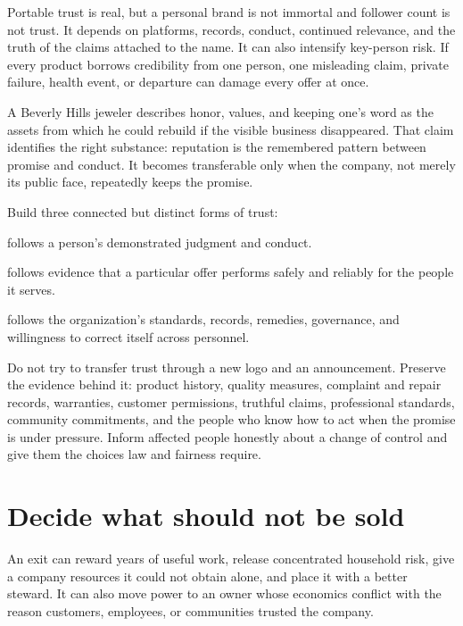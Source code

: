 Portable trust is real, but a personal brand is not immortal and follower count
is not trust. It depends on platforms, records, conduct, continued relevance,
and the truth of the claims attached to the name. It can also intensify
key-person risk. If every product borrows credibility from one person, one
misleading claim, private failure, health event, or departure can damage every
offer at once.

A Beverly Hills jeweler describes honor, values, and keeping one's word as the
assets from which he could rebuild if the visible business disappeared. That
claim identifies the right substance: reputation is the remembered pattern
between promise and conduct. It becomes transferable only when the company,
not merely its public face, repeatedly keeps the promise.

Build three connected but distinct forms of trust:

\begin{description}[leftmargin=2.8em,style=nextline]
\item[Personal trust] follows a person's demonstrated judgment and conduct.
\item[Product trust] follows evidence that a particular offer performs safely
  and reliably for the people it serves.
\item[Institutional trust] follows the organization's standards, records,
  remedies, governance, and willingness to correct itself across personnel.
\end{description}

Do not try to transfer trust through a new logo and an announcement. Preserve
the evidence behind it: product history, quality measures, complaint and repair
records, warranties, customer permissions, truthful claims, professional
standards, community commitments, and the people who know how to act when the
promise is under pressure. Inform affected people honestly about a change of
control and give them the choices law and fairness require.

\section{Decide what should not be sold}

An exit can reward years of useful work, release concentrated household risk,
give a company resources it could not obtain alone, and place it with a better
steward. It can also move power to an owner whose economics conflict with the
reason customers, employees, or communities trusted the company.

